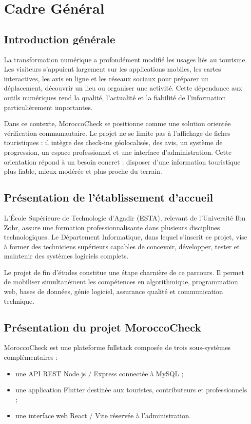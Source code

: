 ﻿\documentclass[12pt,a4paper]{report}
\begin{document}
\clearpage
\tableofcontents
\clearpage
\listoffigures
\clearpage
\listoftables

\clearpage
{}

\chapter{Cadre G\'en\'eral}

\section{Introduction g\'en\'erale}
La transformation num\'erique a profond\'ement modifi\'e les usages li\'es au tourisme. Les visiteurs s'appuient largement sur les applications mobiles, les cartes interactives, les avis en ligne et les r\'eseaux sociaux pour pr\'eparer un d\'eplacement, d\'ecouvrir un lieu ou organiser une activit\'e. Cette d\'ependance aux outils num\'eriques rend la qualit\'e, l'actualit\'e et la fiabilit\'e de l'information particuli\`erement importantes.

Dans ce contexte, MoroccoCheck se positionne comme une solution orient\'ee v\'erification communautaire. Le projet ne se limite pas \`a l'affichage de fiches touristiques : il int\`egre des check-ins g\'eolocalis\'es, des avis, un syst\`eme de progression, un espace professionnel et une interface d'administration. Cette orientation r\'epond \`a un besoin concret : disposer d'une information touristique plus fiable, mieux mod\'er\'ee et plus proche du terrain.

\section{Pr\'esentation de l'\'etablissement d'accueil}
L'\'Ecole Sup\'erieure de Technologie d'Agadir (ESTA), relevant de l'Universit\'e Ibn Zohr, assure une formation professionnalisante dans plusieurs disciplines technologiques. Le D\'epartement Informatique, dans lequel s'inscrit ce projet, vise \`a former des techniciens sup\'erieurs capables de concevoir, d\'evelopper, tester et maintenir des syst\`emes logiciels complets.

Le projet de fin d'\'etudes constitue une \'etape charni\`ere de ce parcours. Il permet de mobiliser simultan\'ement les comp\'etences en algorithmique, programmation web, bases de donn\'ees, g\'enie logiciel, assurance qualit\'e et communication technique.

\section{Pr\'esentation du projet MoroccoCheck}
MoroccoCheck est une plateforme fullstack compos\'ee de trois sous-syst\`emes compl\'ementaires :
\begin{itemize}
  \item une API REST Node.js / Express connect\'ee \`a MySQL ;
  \item une application Flutter destin\'ee aux touristes, contributeurs et professionnels ;
  \item une interface web React / Vite r\'eserv\'ee \`a l'administration.
\end{itemize}
\end{document}
